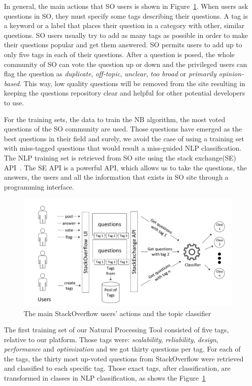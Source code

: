 In general, the main actions that SO users is shown in Figure~\ref{fig:stackoverflow_questions}. When users ask questions in SO, they must specify some tags describing their questions. A tag is a keyword or a label that places their question in a category with other, similar questions. SO users usually try to add as many tags as possible in order to make their questions popular and get them answered. SO permits users to add up to only five tags in each of their questions. After a question is posed, the whole community of SO can vote the question up or down and the privileged users can flag the question as \emph{duplicate}, \emph{off-topic}, \emph{unclear}, \emph{too broad} or \emph{primarily opinion-based}. This way, low quality questions will be removed from the site resulting in keeping the questions repository clear and helpful for other potential developers to use.

For the training sets, the data to train the NB algorithm, the most voted questions of the SO community are used. Those questions have emerged as the best questions in their field and surely, we avoid the case of using a training set with miss-tagged questions that would result a miss-guided NLP classification. The NLP training set is retrieved from SO site using the stack exchange(SE) API~\cite{stackexchange_url}. The SE API is a powerful API, which allows us to take the questions, the answers, the users and all the information that exists in SO site through a programming interface.

\begin{figure}[h]
	\centering
	\includegraphics[width=1\textwidth]{./fig/StackOverFlow.pdf}
	\caption{The main StackOverflow users' actions and the topic classifier}
	\label{fig:stackoverflow_questions}
\end{figure}

The first training set of our Natural Processing Tool consisted of five tags, relative to our platform. Those tags were: \emph{scalability}, \emph{reliability}, \emph{design}, \emph{performance} and \emph{optimization} and we got thirty questions per tag. For each of the tags, the thirty most up-voted questions from StackOverflow were retrieved and classified to each specific tag. Those exact tags, after classification, are transformed in classes in NLP classification, as shows the Figure~\ref{fig:stackoverflow_questions}

